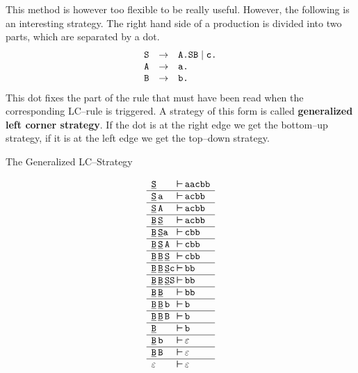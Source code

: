 This method is however too flexible to be really useful.
However, the following is an interesting strategy. The right
hand side of a production is divided into two parts, which
are separated by a dot.
\begin{equation}
\begin{array}{l@{\quad \pf\quad}l}
\mbox{\tt S} & \mbox{\tt A.SB} \mid \mbox{\tt c.} \\
\mbox{\tt A} & \mbox{\tt a.} \\
\mbox{\tt B} & \mbox{\tt b.}
\end{array}
\end{equation}
This dot fixes the part of the rule that must have been read
when the corresponding LC--rule is triggered. A strategy of this
form is called \textbf{generalized left corner strategy}.
If the dot is at the right edge we get the bottom--up strategy,
if it is at the left edge we get the top--down strategy.
\begin{table}
\caption{The Generalized LC--Strategy}
\label{tab:lc}
$$\begin{array}{l@{\, \bvdash\,}l}
\uli{\mbox{\tt S}} & \mbox{\tt aacbb} \\\hline
\uli{\mbox{\tt S}}\, \mbox{\tt a} & \mbox{\tt acbb} \\\hline
\uli{\mbox{\tt S}}\, \mbox{\tt A} & \mbox{\tt acbb} \\\hline
\uli{\mbox{\tt B}}\, \uli{\mbox{\tt S}} & \mbox{\tt acbb} \\\hline
\uli{\mbox{\tt B}}\, \uli{\mbox{\tt S}} \mbox{\tt a}
    & \mbox{\tt cbb} \\\hline
\uli{\mbox{\tt B}}\, \uli{\mbox{\tt S}} \,\mbox{\tt A}
    & \mbox{\tt cbb} \\\hline
\uli{\mbox{\tt B}}\, \uli{\mbox{\tt B}}\, \uli{\mbox{\tt S}}
    & \mbox{\tt cbb} \\\hline
\uli{\mbox{\tt B}}\, \uli{\mbox{\tt B}}\, \uli{\mbox{\tt S}}
    \mbox{\tt c} & \mbox{\tt bb} \\\hline
\uli{\mbox{\tt B}}\, \uli{\mbox{\tt B}}\, \uli{\mbox{\tt S}} \mbox{\tt S}
    & \mbox{\tt bb} \\\hline
\uli{\mbox{\tt B}}\, \uli{\mbox{\tt B}} & \mbox{\tt bb} \\\hline
\uli{\mbox{\tt B}}\, \uli{\mbox{\tt B}}\, \mbox{\tt b}
    & \mbox{\tt b} \\\hline
\uli{\mbox{\tt B}}\, \uli{\mbox{\tt B}}\, \mbox{\tt B} & \mbox{\tt b} \\\hline
\uli{\mbox{\tt B}} & \mbox{\tt b} \\\hline
\uli{\mbox{\tt B}}\, \mbox{\tt b} & \varepsilon \\\hline
\uli{\mbox{\tt B}}\, \mbox{\tt B} & \varepsilon \\\hline
\varepsilon & \varepsilon
\end{array}$$
\end{table}
